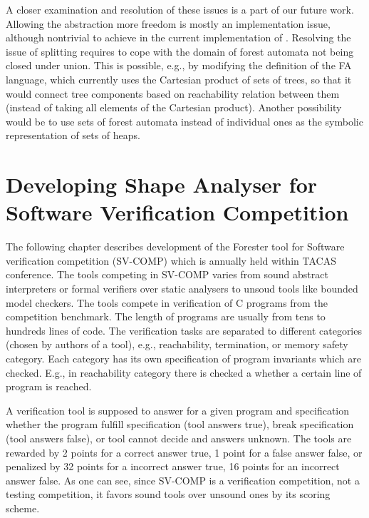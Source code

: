 {A closer examination and resolution of these issues is a part of our future
work. Allowing the abstraction more freedom is mostly an implementation issue,
although nontrivial to achieve in the current implementation of \forester{}.
Resolving the issue of splitting requires to cope with the domain of forest
automata not being closed under union. This is possible, e.g., by modifying the
definition of the FA language, which currently uses the Cartesian product of
sets of trees, so that it would connect tree components based on reachability
relation between them (instead of taking all elements of the Cartesian product).
Another possibility would be to use sets of forest automata instead of
individual ones as the symbolic representation of sets of heaps.  


\chapter{Developing Shape Analyser for Software Verification Competition}
\label{ch:svcomp}
The following chapter describes development of the Forester tool \cite{foresterweb}
for Software verification competition \cite{svcompweb} (SV-COMP) which is annually held within TACAS conference.
The tools competing in SV-COMP varies from sound abstract interpreters or formal verifiers over static analysers
to unsoud tools like bounded model checkers.
The tools compete in verification of C programs from the competition benchmark.
The length of programs are usually from tens to hundreds lines of code.
The verification tasks are separated to different categories (chosen by authors of a tool), e.g., reachability,
termination, or memory safety category.
Each category has its own specification of program invariants which are checked.
E.g., in reachability category there is checked a whether a certain line of program is reached.

A verification tool is supposed to answer for a given program and specification whether
the program fulfill specification (tool answers true), break specification (tool answers
false), or tool cannot decide and answers unknown.
The tools are rewarded by 2 points for a correct answer true, 1 point for a false answer false,
or penalized by 32 points for a incorrect answer true, 16 points for an incorrect answer false.
As one can see, since SV-COMP is a verification competition, not a testing competition, it favors
sound tools over unsound ones by its scoring scheme.

}
